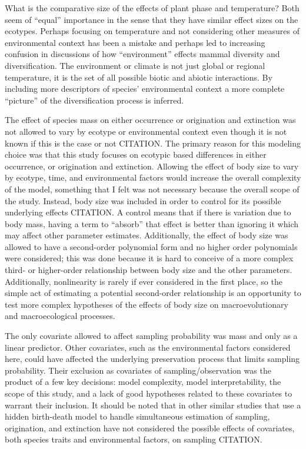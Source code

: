\documentclass[12pt,letterpaper]{article}
\begin{document}
What is the comparative size of the effects of plant phase and temperature? Both seem of ``equal'' importance in the sense that they have similar effect sizes on the ecotypes. Perhaps focusing on temperature and not considering other measures of environmental context has been a mistake and perhaps led to increasing confusion in discussions of how ``environment'' effects mammal diversity and diversification. The environment or climate is not just global or regional temperature, it is the set of all possible biotic and abiotic interactions. By including more descriptors of species' environmental context a more complete ``picture'' of the diversification process is inferred.


The effect of species mass on either occurrence or origination and extinction was not allowed to vary by ecotype or environmental context even though it is not known if this is the case or not CITATION. The primary reason for this modeling choice was that this study focuses on ecotypic based differences in either occurrence, or origination and extinction. Allowing the effect of body size to vary by ecotype, time, and environmental factors would increase the overall complexity of the model, something that I felt was not necessary because the overall scope of the study. Instead, body size was included in order to control for its possible underlying effects CITATION. A control means that if there is variation due to body mass, having a term to ``absorb'' that effect is better than ignoring it which may affect other parameter estimates. Additionally, the effect of body size was allowed to have a second-order polynomial form and no higher order polynomials were considered; this was done because it is hard to conceive of a more complex third- or higher-order relationship between body size and the other parameters. Additionally, nonlinearity is rarely if ever considered in the first place, so the simple act of estimating a potential second-order relationship is an opportunity to test more complex hypotheses of the effects of body size on macroevolutionary and macroecological processes.

The only covariate allowed to affect sampling probability was mass and only as a linear predictor. Other covariates, such as the environmental factors considered here, could have affected the underlying preservation process that limits sampling probability. Their exclusion as covariates of sampling/observation was the product of a few key decisions: model complexity, model interpretability, the scope of this study, and a lack of good hypotheses related to these covariates to warrant their inclusion. It should be noted that in other similar studies that use a hidden birth-death model to handle simultaneous estimation of sampling, origination, and extinction have not considered the possible effects of covariates, both species traits and environmental factors, on sampling CITATION.
\end{document}
